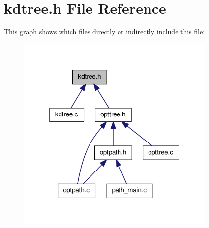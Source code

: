 \hypertarget{a00014}{\section{kdtree.\-h \-File \-Reference}
\label{d2/de7/a00014}
}
\-This graph shows which files directly or indirectly include this file\-:\nopagebreak
\begin{figure}[H]
\begin{center}
\leavevmode
\includegraphics[width=277pt]{dc/de2/a00024}
\end{center}
\end{figure}
